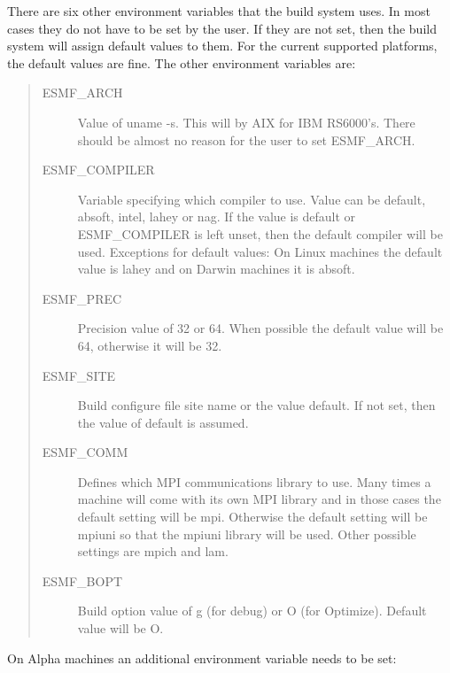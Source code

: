 There are six other environment variables that the build system uses.
In most cases they do not have to be set by the user.  If they are not
set, then the build system will assign default values to them.  For the
current supported platforms, the default values are fine.  The other
environment variables are:
\begin{quote}
\begin{description}

  \item[ESMF\_ARCH] Value of uname -s.  This will by AIX for IBM
                 RS6000's.  There should be almost no reason for the
                 user to set ESMF\_ARCH.

  \item[ESMF\_COMPILER] Variable specifying which compiler to use.  Value
                   can be default, absoft, intel, lahey or nag. 
                   If the value is default or ESMF\_COMPILER is 
                   left unset, then the default compiler 
                   will be used.  Exceptions for default values:  
                   On Linux machines the default value 
                   is lahey and on Darwin machines it is absoft.

  \item[ESMF\_PREC] Precision value of 32 or 64.  When possible the
                 default value will be 64, otherwise it will be 32.


  \item[ESMF\_SITE] Build configure file site name or the value
                 default.  If not set, then the value of default is
                 assumed.

  \item[ESMF\_COMM] Defines which MPI communications library to use.  
                   Many times a machine will come with its own MPI 
                   library and in those cases the default setting 
                   will be mpi.  Otherwise the default setting will be 
                   mpiuni so that the mpiuni library will be used.
                   Other possible settings are mpich and lam.

  \item[ESMF\_BOPT] Build option value of g (for debug) or O (for
                 Optimize).  Default value will be O.

\end{description}
\end{quote}

On Alpha machines an additional environment variable needs
to be set:

